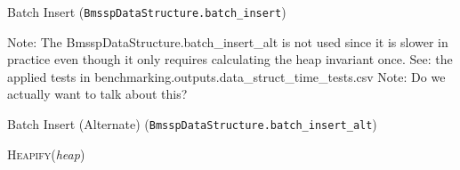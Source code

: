 \begin{algorithm}[!htbp]
\caption{Batch Insert (\texttt{BmsspDataStructure.batch\_insert})}
\label{alg:bmssp_batch_insert}
\SetAlgoLined
{}
\end{algorithm}

Note: The BmsspDataStructure.batch_insert_alt is not used since it is slower in practice even though it only requires calculating the heap invariant once. 
See: the applied tests in benchmarking.outputs.data_struct_time_tests.csv
Note: Do we actually want to talk about this?

\begin{algorithm}[!htbp]
\caption{Batch Insert (Alternate) (\texttt{BmsspDataStructure.batch\_insert\_alt})}
\label{alg:bmssp_batch_insert_alt}
\SetAlgoLined
{}
\textsc{Heapify}(\textit{heap})\;
\end{algorithm}